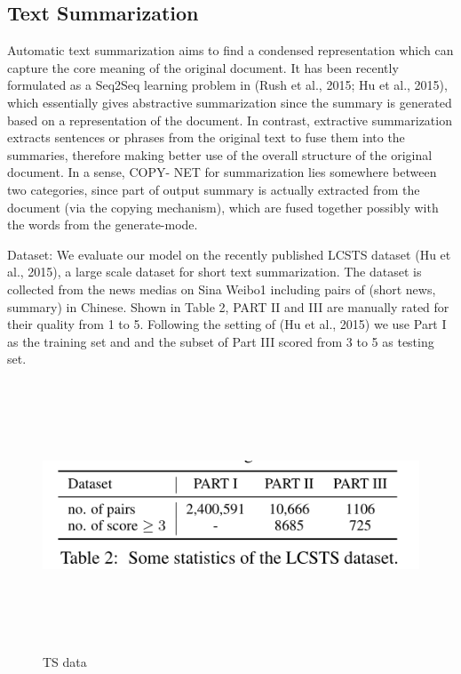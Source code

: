 \documentclass[UTF8]{ctexart}
\begin{document}
    \subsection{Text Summarization}

    Automatic text summarization aims to find a condensed representation which can capture the core
    meaning of the original document. It has been
    recently formulated as a Seq2Seq learning problem in (Rush et al., 2015; Hu et al., 2015), which
    essentially gives abstractive summarization since
    the summary is generated based on a representation of the document. In contrast, extractive
    summarization extracts sentences or phrases from
    the original text to fuse them into the summaries,
    therefore making better use of the overall structure of the original document. In a sense, COPY-
    NET for summarization lies somewhere between
    two categories, since part of output summary is actually extracted from the document (via the copying mechanism), which are fused together possibly with the words from the generate-mode.

    Dataset: We evaluate our model on the recently
    published LCSTS dataset (Hu et al., 2015), a large
    scale dataset for short text summarization. The
    dataset is collected from the news medias on Sina
    Weibo1 including pairs of (short news, summary)
    in Chinese. Shown in Table 2, PART II and III are
    manually rated for their quality from 1 to 5. Following the setting of (Hu et al., 2015) we use Part I as the training set and and the subset of Part III
    scored from 3 to 5 as testing set.
    
    \begin{figure}[htbp]
        \centering
        \vspace{-0.35cm} 
        \includegraphics[width=14cm,height=8cm]{pictures/data.jpg}
        \caption{ TS data }
    \end{figure}
\end{document}
